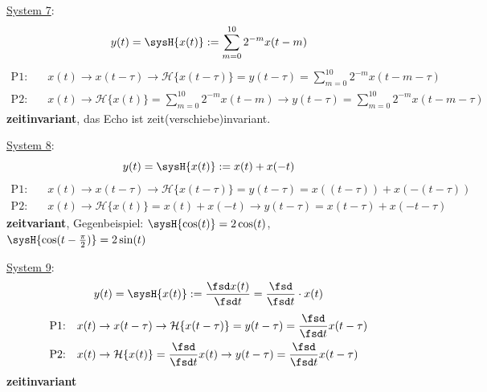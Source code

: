 \begin{Loesung}
\item  \underline{System 7}:
\begin{equation}
y(t) = \sysH{x(t)}:= \sum_{m=0}^{10} 2^{-m} x(t-m)
\end{equation}
\begin{align}
\text{P1:}& \quad x(t)\rightarrow x(t-\tau)\rightarrow \mathcal{H}\{x(t-\tau)\}=y(t-\tau)=\sum_{m=0}^{10} 2^{-m} x(t-m-\tau)\\
\text{P2:}& \quad x(t)\rightarrow \mathcal{H}\{x(t)\}=\sum_{m=0}^{10} 2^{-m} x(t-m)\rightarrow y(t-\tau) = \sum_{m=0}^{10} 2^{-m} x(t-m-\tau)
\end{align}
\textbf{zeitinvariant}, das Echo ist zeit(verschiebe)invariant.

\item  \underline{System 8}:
\begin{equation}
y(t) = \sysH{x(t)}:= x(t) + x(-t)
\end{equation}
\begin{align}
\text{P1:}& \quad x(t)\rightarrow x(t-\tau)\rightarrow \mathcal{H}\{x(t-\tau)\}=y(t-\tau) = x((t-\tau)) + x(-(t-\tau))\\
\text{P2:}& \quad x(t)\rightarrow \mathcal{H}\{x(t)\}=x(t) + x(-t)\rightarrow y(t-\tau)=x(t-\tau) + x(-t-\tau)
\end{align}
\textbf{zeitvariant}, Gegenbeispiel: $\sysH{\cos(t)}=2\cos(t)$, $\sysH{\cos(t-\frac{\pi}{2})}=2\sin(t)$

\item  \underline{System 9}:
\begin{equation}
y(t) = \sysH{x(t)}:= \frac{\fsd x(t)}{\fsd t} = \frac{\fsd}{\fsd t} \cdot x(t)
\end{equation}
\begin{align}
\text{P1:}& \quad x(t)\rightarrow x(t-\tau)\rightarrow \mathcal{H}\{x(t-\tau)\}=y(t-\tau)=\frac{\fsd}{\fsd t} x(t-\tau)\\
\text{P2:}& \quad x(t)\rightarrow \mathcal{H}\{x(t)\}=\frac{\fsd}{\fsd t}  x(t)\rightarrow y(t-\tau)=\frac{\fsd}{\fsd t}  x(t-\tau)
\end{align}
\textbf{zeitinvariant}


\end{Loesung}
